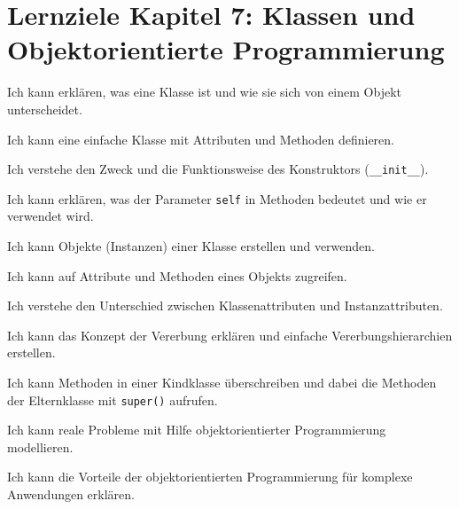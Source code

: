 \section{Lernziele Kapitel 7: Klassen und Objektorientierte Programmierung}
\begin{todolist}
    \item Ich kann erklären, was eine Klasse ist und wie sie sich von einem Objekt unterscheidet.
    \item Ich kann eine einfache Klasse mit Attributen und Methoden definieren.
    \item Ich verstehe den Zweck und die Funktionsweise des Konstruktors (\lstinline|__init__|).
    \item Ich kann erklären, was der Parameter \lstinline|self| in Methoden bedeutet und wie er verwendet wird.
    \item Ich kann Objekte (Instanzen) einer Klasse erstellen und verwenden.
    \item Ich kann auf Attribute und Methoden eines Objekts zugreifen.
    \item Ich verstehe den Unterschied zwischen Klassenattributen und Instanzattributen.
    \item Ich kann das Konzept der Vererbung erklären und einfache Vererbungshierarchien erstellen.
    \item Ich kann Methoden in einer Kindklasse überschreiben und dabei die Methoden der Elternklasse mit \lstinline|super()| aufrufen.
    \item Ich kann reale Probleme mit Hilfe objektorientierter Programmierung modellieren.
    \item Ich kann die Vorteile der objektorientierten Programmierung für komplexe Anwendungen erklären.
\end{todolist}